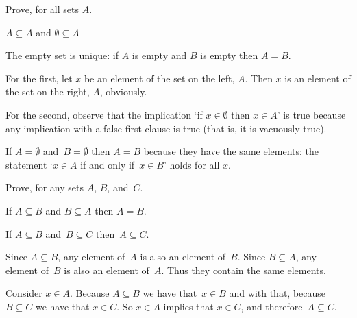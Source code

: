 \documentclass{test}  %
\begin{document}
\begin{ex} \label{ex:EmptySetUnique}
Prove, for all sets $A$. 
\begin{exes}
\item $A\subseteq A$ and $\emptyset\subseteq A$
\item The empty set is unique: if $A$ is empty and $B$ is empty then $A=B$.
\end{exes}
\begin{ans}
\begin{exes}
\item For the first, let $x$ be an element of the set on the left, $A$.
  Then $x$ is an element of the set on the right, $A$, obviously.

  For the second, observe that the implication 
  `if $x\in\emptyset$ then $x\in A$' is true 
  because any implication with a false first clause is true
  (that is, it is vacuously true).
\item If $A=\emptyset$ and~$B=\emptyset$ then $A=B$ because they have the
  same elements: the statement `$x\in A$ if and only if~$x\in B$' holds   
  for all $x$.
\end{exes}
\end{ans}
\end{ex}

\begin{ex}  \label{ex:PropertiesOfSubset}
Prove, for any sets $A$, $B$, and~$C$.
\begin{exes} 
\item {}
  If $A\subseteq B$ and $B\subseteq A$ then $A=B$.  
\item {}
  If $A\subseteq B$ and~$B\subseteq C$ then~$A\subseteq C$.  
\end{exes}
\begin{ans}
\begin{exes}
\item Since $A\subseteq B$, any element of~$A$ is also an element of~$B$.
   Since $B\subseteq A$, any element of~$B$ is also an element of~$A$.
   Thus they contain the same elements.
\item Consider $x\in A$.
   Because $A\subseteq B$ we have that~$x\in B$ and with that, because
   $B\subseteq C$ we have that $x\in C$.
   So $x\in A$ implies that $x\in C$, and therefore~$A\subseteq C$.
\end{exes}
\end{ans}
\end{ex}
\end{document}
